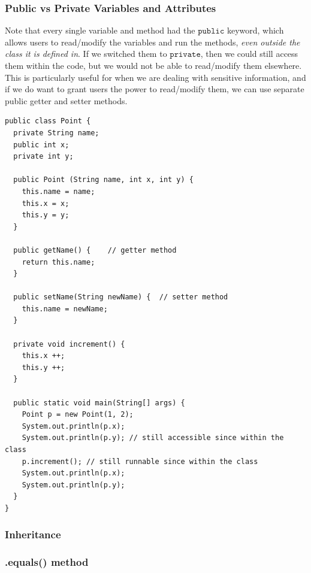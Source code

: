 \documentclass{article}
\theoremstyle{definition}
\theoremstyle{remark}
\theoremstyle{definition}
\begin{document}
\subsubsection{Public vs Private Variables and Attributes}
Note that every single variable and method had the $\texttt{public}$ keyword, which allows users to read/modify the variables and run the methods, \textit{even outside the class it is defined in}. If we switched them to $\texttt{private}$, then we could still access them within the code, but we would not be able to read/modify them elsewhere. This is particularly useful for when we are dealing with sensitive information, and if we do want to grant users the power to read/modify them, we can use separate public getter and setter methods. 
\begin{verbatim}
public class Point {
  private String name; 
  public int x; 
  private int y;  

  public Point (String name, int x, int y) {
    this.name = name; 
    this.x = x; 
    this.y = y; 
  }
  
  public getName() {    // getter method 
    return this.name; 
  }
  
  public setName(String newName) {  // setter method 
    this.name = newName; 
  }

  private void increment() {
    this.x ++; 
    this.y ++; 
  }

  public static void main(String[] args) {
    Point p = new Point(1, 2); 
    System.out.println(p.x); 
    System.out.println(p.y); // still accessible since within the class 
    p.increment(); // still runnable since within the class 
    System.out.println(p.x); 
    System.out.println(p.y);
  }
}
\end{verbatim}

\subsubsection{Inheritance}

\subsubsection{.equals() method}
\end{document}
